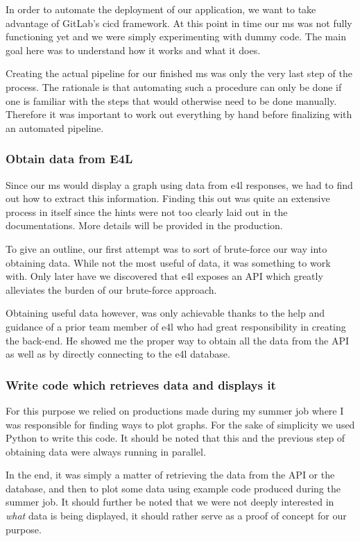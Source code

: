 In order to automate the deployment of our application, we want to
take advantage of GitLab's \gls{cicd} framework. At this point in time
our \gls{ms} was not fully functioning yet and we were simply
experimenting with dummy code. The main goal here was to understand
how it works and what it does.

Creating the actual pipeline for our finished \gls{ms} was only the
very last step of the process. The rationale is that automating such a
procedure can only be done if one is familiar with the steps that
would otherwise need to be done manually. Therefore it was important
to work out everything by hand before finalizing with an automated
pipeline.

\subsubsection{Obtain data from E4L}

Since our \gls{ms} would display a graph using data from \gls{e4l}
responses, we had to find out how to extract this information. Finding
this out was quite an extensive process in itself since the hints were
not too clearly laid out in the documentations. More details will be
provided in the production.

To give an outline, our first attempt was to sort of brute-force our
way into obtaining data. While not the most useful of data, it was
something to work with. Only later have we discovered that \gls{e4l}
exposes an API which greatly alleviates the burden of our brute-force
approach.

Obtaining useful data however, was only achievable thanks to the help
and guidance of a prior team member of \gls{e4l} who had great
responsibility in creating the back-end. He showed me the proper way to
obtain all the data from the API as well as by directly connecting to
the \gls{e4l} database.

\subsubsection{Write code which retrieves data and displays it}

For this purpose we relied on productions made during my summer job
where I was responsible for finding ways to plot graphs. For the sake
of simplicity we used Python to write this code. It should be noted
that this and the previous step of obtaining data were always running
in parallel.

In the end, it was simply a matter of retrieving the data from the API
or the database, and then to plot some data using example code
produced during the summer job. It should further be noted that we
were not deeply interested in \textit{what} data is being displayed, it should
rather serve as a proof of concept for our purpose.

